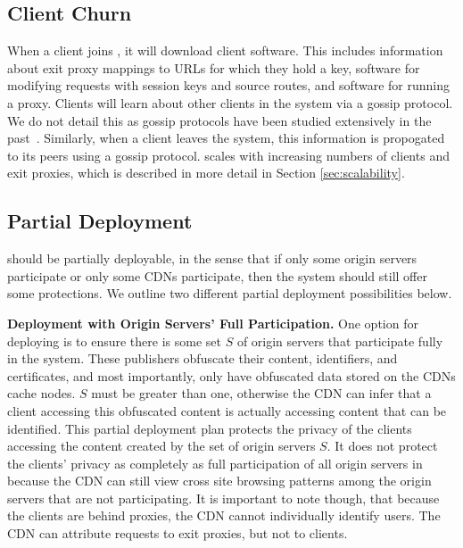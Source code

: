 \subsection{Client Churn}
\label{sec:join}

When a client joins \system{}, it will download \system{} client software.  This
includes information about exit proxy mappings to URLs for which they hold a key, 
software for modifying requests with session keys and source routes, and software 
for running a proxy.  Clients will learn about other clients in the system via 
a gossip protocol.  We do not detail this as gossip protocols have been studied 
extensively in the past~\cite{kermarrec2007gossiping,vogels2003power,eugster2004epidemic}.  
Similarly, when a client leaves the system, this information is propogated to its 
peers using a gossip protocol.  \system{} scales with increasing numbers of clients and 
exit proxies, which is described in more detail in Section \ref{sec:scalability}.

\subsection{Partial Deployment}
\label{sec:partial}
\system{} should be partially deployable, in the sense that if only some origin servers participate or only some CDNs participate, then 
the system should still offer some protections.  We outline two different partial
deployment possibilities below.

\textbf{Deployment with Origin Servers' Full Participation.}
One option for deploying \system{} is to ensure there is some set $S$ of origin servers that participate fully in the 
system.  These publishers obfuscate their content, identifiers, and certificates, and most importantly, only have 
obfuscated data stored on the CDNs cache nodes.  $S$ must be greater than one, otherwise the CDN can infer 
that a client accessing this obfuscated content is actually accessing content that can be identified.  This partial deployment plan 
 protects the privacy of the clients accessing the content created by the set of origin servers $S$.  It does not 
protect the clients' privacy as completely as full participation of all origin servers in \system{} because the CDN can 
still view cross site browsing patterns among the origin servers that are not participating. It is important to note though, that 
because the clients are behind proxies, the CDN cannot individually identify users.  The CDN can attribute requests to exit proxies, but 
not to clients.  

